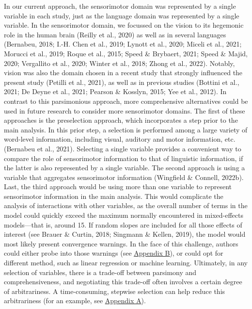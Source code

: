 \documentclass[
  12pt,
  man,floatsintext]{apa7}
\begin{document}
In our current approach, the sensorimotor domain was represented by a single variable in each study, just as the language domain was represented by a single variable. In the sensorimotor domain, we focussed on the vision to its hegemonic role in the human brain (Reilly et al., 2020) as well as in several languages (Bernabeu, 2018; I.-H. Chen et al., 2019; Lynott et al., 2020; Miceli et al., 2021; Morucci et al., 2019; Roque et al., 2015; Speed \& Brybaert, 2021; Speed \& Majid, 2020; Vergallito et al., 2020; Winter et al., 2018; Zhong et al., 2022). Notably, vision was also the domain chosen in a recent study that strongly influenced the present study (Petilli et al., 2021), as well as in previous studies (Bottini et al., 2021; De Deyne et al., 2021; Pearson \& Kosslyn, 2015; Yee et al., 2012). In contrast to this parsimonious approach, more comprehensive alternatives could be used in future research to consider more sensorimotor domains. The first of these approaches is the preselection approach, which incorporates a step prior to the main analysis. In this prior step, a selection is performed among a large variety of word-level information, including visual, auditory and motor information, etc. (Bernabeu et al., 2021). Selecting a single variable provides a convenient way to compare the role of sensorimotor information to that of linguistic information, if the latter is also represented by a single variable. The second approach is using a variable that aggregates sensorimotor information (Wingfield \& Connell, 2022b). Last, the third approach would be using more than one variable to represent sensorimotor information in the main analysis. This would complicate the analysis of interactions with other variables, as the overall number of terms in the model could quickly exceed the maximum normally encountered in mixed-effects models---that is, around 15. If random slopes are included for all those effects of interest (see Brauer \& Curtin, 2018; Singmann \& Kellen, 2019), the model would most likely present convergence warnings. In the face of this challenge, authors could either probe into those warnings (see \protect\hyperlink{appendix-B-frequentist-analysis-diagnostics}{\underline{Appendix B}}), or could opt for different method, such as linear regression or machine learning. Ultimately, in any selection of variables, there is a trade-off between parsimony and comprehensiveness, and negotiating this trade-off often involves a certain degree of arbitrariness. A time-consuming, stepwise selection can help reduce this arbitrariness (for an example, see \protect\hyperlink{appendix-A-lexical-covariates}{\underline{Appendix A}}).
\end{document}
